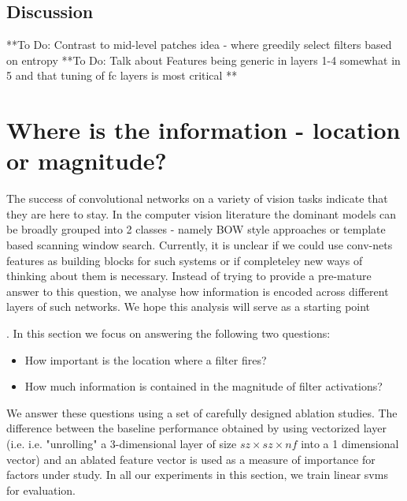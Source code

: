 \documentclass[runningheads]{llncs}
\begin{document}
\subsection{Discussion}
\label{sub:fine-discussion}
**To Do: Contrast to mid-level patches idea - where greedily select filters based on entropy
**To Do: Talk about Features being generic in layers 1-4 somewhat in 5 and that tuning of fc layers is most critical **


\section{Where is the information - location or magnitude?}
\label{sec-where-info}
The success of convolutional networks on a variety of vision tasks indicate that they are here to stay. In the computer vision literature the dominant models can be broadly grouped into 2 classes - namely BOW style approaches or template based scanning window search. Currently, it is unclear if we could use conv-nets features as building blocks for such systems or if completeley new ways of thinking about them is necessary. 
Instead of trying to provide a pre-mature answer to this question, we analyse how information is encoded across different layers of such  networks. We hope this analysis will serve as a starting point

. In this section we focus on answering the following two questions:
\begin{itemize}
\item How important is the location where a filter fires?
\item How much information is contained in the magnitude of filter activations?
\end{itemize}

We answer these questions using a set of carefully designed ablation studies. The difference between the baseline performance obtained by using vectorized  layer (i.e. i.e. "unrolling" a 3-dimensional layer of size $sz \times sz \times nf$ into a 1 dimensional vector) and an ablated feature vector is used as a measure of importance for factors under study. In all our experiments in this section, we train linear svms for evaluation.
\end{document}
